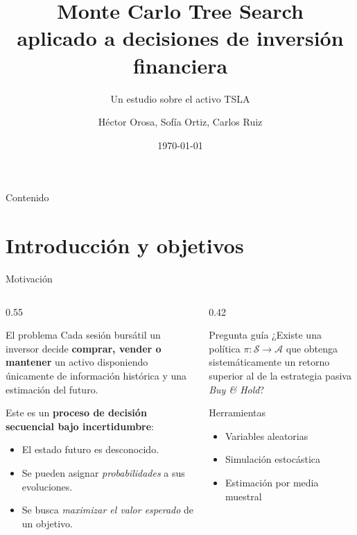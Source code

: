 \documentclass[aspectratio=169, 10pt]{beamer}
\title[MCTS Financiero]{%
  Monte Carlo Tree Search\\
  aplicado a decisiones de inversión financiera}
\subtitle{Un estudio sobre el activo TSLA}
\author[]{Héctor Orosa, Sofía Ortiz, Carlos Ruiz}
\institute{%
  Universitdad de Valencia\\
  Métodos Numéricos}
\date{\today}
\begin{document}

\begin{frame}
  \titlepage
\end{frame}

\begin{frame}{Contenido}
  \tableofcontents
\end{frame}

\section{Introducción y objetivos}

\begin{frame}{Motivación}
  \begin{columns}[T]
    \begin{column}{0.55\textwidth}
      \begin{block}{El problema}
        Cada sesión bursátil un inversor decide \textbf{comprar, vender o
        mantener} un activo disponiendo únicamente de información histórica
        y una estimación del futuro.
      \end{block}
      \vspace{0.4cm}
      Este es un \textbf{proceso de decisión secuencial bajo incertidumbre}:
      \begin{itemize}
        \item El estado futuro es desconocido.
        \item Se pueden asignar \emph{probabilidades} a sus evoluciones.
        \item Se busca \emph{maximizar el valor esperado} de un objetivo.
      \end{itemize}
    \end{column}
    \begin{column}{0.42\textwidth}
      \begin{alertblock}{Pregunta guía}
        ¿Existe una política $\pi:\mathcal{S}\to\mathcal{A}$ que obtenga
        sistemáticamente un retorno superior al de la estrategia pasiva
        \emph{Buy \& Hold}?
      \end{alertblock}
      \vspace{0.3cm}
      \begin{exampleblock}{Herramientas}
        \begin{itemize}
          \item Variables aleatorias
          \item Simulación estocástica
          \item Estimación por media muestral
        \end{itemize}
      \end{exampleblock}
    \end{column}
  \end{columns}
\end{frame}
\end{document}
